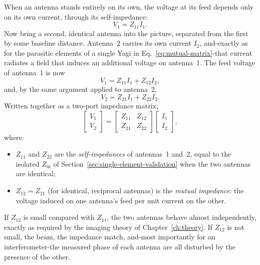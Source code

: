 When an antenna stands entirely on its own, the voltage at its feed depends
only on its own current, through its self-impedance:
\begin{equation}
    V_1 = Z_{11} I_1 .
    \label{eq:v1-alone}
\end{equation}
Now bring a second, identical antenna into the picture, separated from the
first by some baseline distance. Antenna~2 carries its own current $I_2$,
and-exactly as for the parasitic elements of a single Yagi in
Eq.~\eqref{eq:mutual-matrix}-that current radiates a field that induces an
additional voltage on antenna~1. The feed voltage of antenna~1 is now
\begin{equation}
    V_1 = Z_{11} I_1 + Z_{12} I_2 ,
    \label{eq:v1-coupled}
\end{equation}
and, by the same argument applied to antenna~2,
\begin{equation}
    V_2 = Z_{21} I_1 + Z_{22} I_2 .
    \label{eq:v2-coupled}
\end{equation}
Written together as a two-port impedance matrix,
\begin{equation}
    \begin{bmatrix} V_1 \\ V_2 \end{bmatrix}
    =
    \begin{bmatrix} Z_{11} & Z_{12} \\ Z_{21} & Z_{22} \end{bmatrix}
    \begin{bmatrix} I_1 \\ I_2 \end{bmatrix},
    \label{eq:two-port-matrix}
\end{equation}
where:
\begin{itemize}[leftmargin=1.5em,itemsep=1pt,topsep=2pt]
  \item $Z_{11}$ and $Z_{22}$ are the \emph{self-impedances} of antennas~1 and~2,
        equal to the isolated $Z_\mathrm{in}$ of Section~\ref{sec:single-element-validation}
        when the two antennas are identical;
  \item $Z_{12}=Z_{21}$ (for identical, reciprocal antennas) is the
        \emph{mutual impedance}: the voltage induced on one antenna's feed
        per unit current on the other.
\end{itemize}
If $Z_{12}$ is small compared with $Z_{11}$, the two antennas behave almost
independently, exactly as required by the imaging theory of
Chapter~\ref{ch:theory}. If $Z_{12}$ is not small, the beam, the impedance
match, and-most importantly for an interferometer-the measured phase of each
antenna are all disturbed by the presence of the other.

